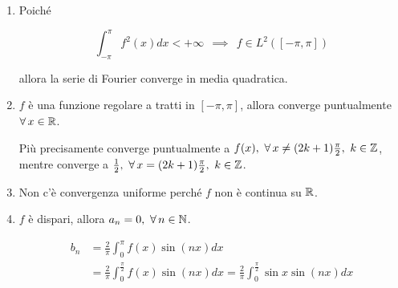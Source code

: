 \begin{enumerate}
\begin{figure}[htpb]
\end{figure}
\FloatBarrier

\item Poiché

\begin{equation*}
\int ^{\pi }_{-\pi } f^{2}( x) dx< +\infty \ \ \implies \ \ f\in L^{2}([ -\pi ,\pi ])
\end{equation*}

allora la serie di Fourier converge in media quadratica.
\item $f$ è una funzione regolare a tratti in $[ -\pi ,\pi ]$, allora converge puntualmente $\forall x\in \RR $.

Più precisamente converge puntualmente a $f( x) ,\ \forall x\neq ( 2k+1)\frac{\pi }{2} ,\ k\in \ZZ $, mentre converge a $\frac{1}{2} ,\ \forall x=( 2k+1)\frac{\pi }{2} ,\ k\in \ZZ $.
\item Non c'è convergenza uniforme perché $f$ non è continua su $\mathbb{R} $.
\item $f$ è dispari, allora $a_{n} =0,\ \forall n\in \NN $.

\begin{equation*}
\begin{aligned}
b_{n} & =\frac{2}{\pi }\int ^{\pi }_{0} f( x)\sin( nx) dx\\
 & =\frac{2}{\pi }\int ^{\frac{\pi }{2}}_{0} f( x)\sin( nx) dx=\frac{2}{\pi }\int ^{\frac{\pi }{2}}_{0}\sin x\sin( nx) dx
\end{aligned}
\end{equation*}


\end{enumerate}
